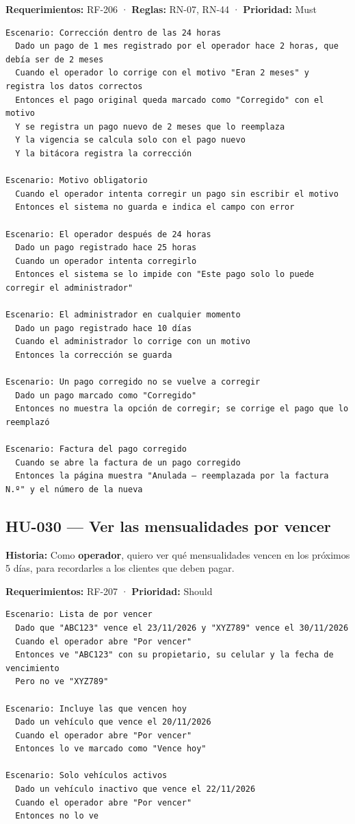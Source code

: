 \textbf{Requerimientos:} RF-206 · \textbf{Reglas:} RN-07, RN-44 · \textbf{Prioridad:} Must


\begin{lstlisting}[style=gherkin]
Escenario: Corrección dentro de las 24 horas
  Dado un pago de 1 mes registrado por el operador hace 2 horas, que debía ser de 2 meses
  Cuando el operador lo corrige con el motivo "Eran 2 meses" y registra los datos correctos
  Entonces el pago original queda marcado como "Corregido" con el motivo
  Y se registra un pago nuevo de 2 meses que lo reemplaza
  Y la vigencia se calcula solo con el pago nuevo
  Y la bitácora registra la corrección

Escenario: Motivo obligatorio
  Cuando el operador intenta corregir un pago sin escribir el motivo
  Entonces el sistema no guarda e indica el campo con error

Escenario: El operador después de 24 horas
  Dado un pago registrado hace 25 horas
  Cuando un operador intenta corregirlo
  Entonces el sistema se lo impide con "Este pago solo lo puede corregir el administrador"

Escenario: El administrador en cualquier momento
  Dado un pago registrado hace 10 días
  Cuando el administrador lo corrige con un motivo
  Entonces la corrección se guarda

Escenario: Un pago corregido no se vuelve a corregir
  Dado un pago marcado como "Corregido"
  Entonces no muestra la opción de corregir; se corrige el pago que lo reemplazó

Escenario: Factura del pago corregido
  Cuando se abre la factura de un pago corregido
  Entonces la página muestra "Anulada – reemplazada por la factura N.º" y el número de la nueva
\end{lstlisting}



\subsection{HU-030 — Ver las mensualidades por vencer}

\textbf{Historia:} Como \textbf{operador}, quiero ver qué mensualidades vencen en los próximos 5 días, para recordarles a los clientes que deben pagar.


\textbf{Requerimientos:} RF-207 · \textbf{Prioridad:} Should


\begin{lstlisting}[style=gherkin]
Escenario: Lista de por vencer
  Dado que "ABC123" vence el 23/11/2026 y "XYZ789" vence el 30/11/2026
  Cuando el operador abre "Por vencer"
  Entonces ve "ABC123" con su propietario, su celular y la fecha de vencimiento
  Pero no ve "XYZ789"

Escenario: Incluye las que vencen hoy
  Dado un vehículo que vence el 20/11/2026
  Cuando el operador abre "Por vencer"
  Entonces lo ve marcado como "Vence hoy"

Escenario: Solo vehículos activos
  Dado un vehículo inactivo que vence el 22/11/2026
  Cuando el operador abre "Por vencer"
  Entonces no lo ve
\end{lstlisting}




